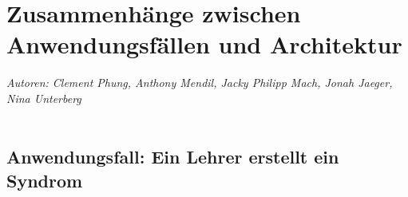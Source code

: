 \documentclass[enabledeprecatedfontcommands,fontsize=11pt,paper=a4,twoside]{scrartcl}
\begin{document}
	\newpage
	\section[Zusammenhänge zwischen Anwendungsfällen und Architektur]{Zusammenhänge zwischen Anwendungsfällen und Architektur}
	\label{sec:anwendungsfaelle}
	\emph{Autoren: Clement Phung, Anthony Mendil, Jacky Philipp Mach, Jonah Jaeger, Nina Unterberg}\\ \\
	
	\subsection{Anwendungsfall: Ein Lehrer erstellt ein Syndrom}
	
\end{document}
